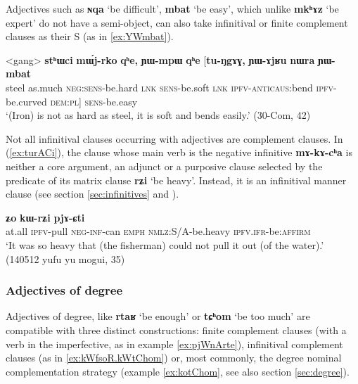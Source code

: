 \documentclass[oldfontcommands,oneside,a4paper,11pt]{article}
\newcommand{\ipa}[1]{\textbf{\phon#1}} %
\newcommand{\jpg}[2]{\ipa{#1} `#2'} %
\begin{document}
Adjectives such as \jpg{ɴqa}{be difficult}, \jpg{mbat}{be easy}, which unlike \jpg{mkʰɤz}{be expert} do not have a semi-object, can also take infinitival or finite complement clauses as their S (as in \ref{ex:YWmbat}).

\begin{exe}
\ex \label{ex:YWmbat}
\gll
<gang> 	\ipa{stʰɯci} 	\ipa{mɯ́j-rko} 	\ipa{qʰe,} 	\ipa{ɲɯ-mpɯ} 	\ipa{qʰe} 	[\ipa{tu-ŋgɤɣ,} 	\ipa{ɲɯ-ɤjʁu} 	\ipa{nɯra} 	\ipa{ɲɯ-mbat} \\
steel as.much \textsc{neg:sens}-be.hard \textsc{lnk} \textsc{sens}-be.soft \textsc{lnk} \textsc{ipfv-anticaus}:bend \textsc{ipfv}-be.curved  \textsc{dem:pl}] \textsc{sens}-be.easy \\
\glt `(Iron) is not as hard as steel, it is soft and bends easily.' (30-Com, 42)
\end{exe}


Not all infinitival clauses occurring with adjectives are complement clauses. In (\ref{ex:turACi}), the clause whose main verb is the negative infinitive \ipa{mɤ-kɤ-cʰa} is neither a core argument, an adjunct or a purposive clause selected by the predicate of its matrix clause \jpg{rʑi}{be heavy}. Instead, it is an infinitival manner clause (see section \ref{sec:infinitives} and \citealt{jacques14linking}).

\begin{exe}
\ex \label{ex:turACi}
\gll [\ipa{maka} 	\ipa{tu-rɤɕi} 	\ipa{mɤ-kɤ-cʰa}] 	\ipa{ʑo} 	\ipa{kɯ-rʑi} 	\ipa{pjɤ-ɕti} \\
at.all \textsc{ipfv}-pull \textsc{neg-inf}-can \textsc{emph} \textsc{nmlz}:S/A-be.heavy \textsc{ipfv.ifr}-be:\textsc{affirm} \\
\glt `It was so heavy that (the fisherman) could not pull it out (of the water).' (140512 yufu yu mogui, 35)
\end{exe}

\subsubsection{Adjectives of degree} \label{sec:degree.complement}
Adjectives of degree, like \jpg{rtaʁ}{be enough} or \jpg{tɕʰom}{be too much} are compatible with three distinct constructions: finite complement clauses (with a verb in the imperfective, as in example \ref{ex:pjWnArte}), infinitival complement clauses (as in \ref{ex:kWfsoR.kWtChom}) or, most commonly, the degree nominal complementation strategy (example \ref{ex:kotChom}, see also section \ref{sec:degree}).
\end{document}
